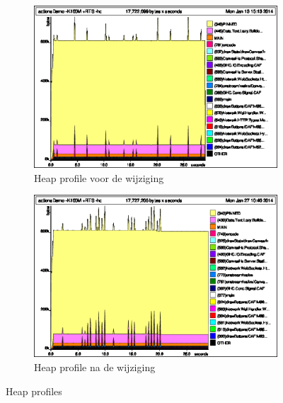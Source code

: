 \begin{figure}
\begin{subfigure}{\textwidth}
  \centering
  \includegraphics[width=0.5\linewidth]{./images/actionsDemoAfterByteStrings.eps}
  \caption{Heap profile voor de wijziging}
  \label{fig:sub1}
\end{subfigure}
\begin{subfigure}{\textwidth}
  \centering
  \includegraphics[width=0.5\linewidth]{./images/actionsDemoBeforeByteStrings.eps}
  \caption{Heap profile na de wijziging}
  \label{fig:sub2}
\end{subfigure}
\caption{Heap profiles}
\label{fig:test}
\end{figure}

